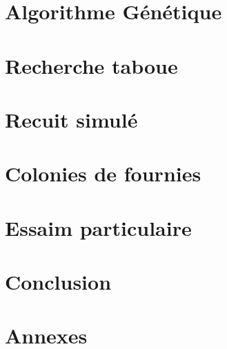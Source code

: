 \documentclass{librairies/lib}
\begin{document}
    


    \newpage


    \section{Algorithme Génétique}\label{sec:algorithme-genetique}

    


    \newpage


    \section{Recherche taboue}\label{sec:recherche-taboue}

    


    \newpage


    \section{Recuit simulé}\label{sec:recuit-simule}

    


    \newpage


    \section{Colonies de fournies}\label{sec:colonies-de-fournies}

    


    \newpage


    \section{Essaim particulaire}\label{sec:essaim-particulaire}

    


    \newpage


    \section{Conclusion}\label{sec:conclusion}

    

    \newpage




    \section*{Annexes}
\end{document}
